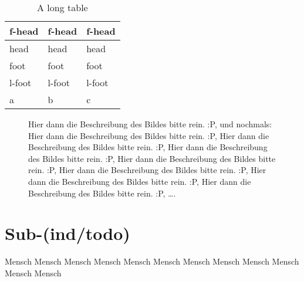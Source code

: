 \begin{longtable}{C{0.25\textwidth}Z{p}{0.2\textwidth}{\raggedleft}l}%
	\caption{A long table}\label{tab:introduction:1}\\%
	\toprule%
	f-head & f-head & f-head \\%
	\midrule%
	\endfirsthead%
	\toprule%
	head & head & head \\%
	\midrule%
	\endhead%
	\midrule%
	foot & foot & foot \\%
	\bottomrule%
	\endfoot%
	\midrule%
	l-foot & l-foot & l-foot \\%
	\bottomrule%
	\endlastfoot%
	a&b&c\\%
\end{longtable}%
\begin{figure}%
	\caption[Test 1]{Hier dann die Beschreibung des Bildes bitte rein. :P, und nochmals: Hier dann die Beschreibung des Bildes bitte rein. :P, Hier dann die Beschreibung des Bildes bitte rein. :P, Hier dann die Beschreibung des Bildes bitte rein. :P, Hier dann die Beschreibung des Bildes bitte rein. :P, Hier dann die Beschreibung des Bildes bitte rein. :P, Hier dann die Beschreibung des Bildes bitte rein. :P, Hier dann die Beschreibung des Bildes bitte rein. :P, \ldots{}.}%
	\label{fig:introduction:1}%
\end{figure}%
%

\section{Sub-(ind/todo)}%
\label{sec:introduction:Sub-indtodo}%
\lipsum[1-1] Mensch
%
\lipsum[1-3] Mensch\newline%
\lipsum[1-4] Mensch%
\lipsum[1-5] Mensch%
\lipsum[1-6] Mensch%
\lipsum[1-7] Mensch%
\lipsum[1-8] Mensch%
\lipsum[1-9] Mensch\newline%
\lipsum[1-10] Mensch\newline%
\lipsum[1-11] Mensch\newline%
\lipsum[1-12] Mensch\newline%
\lipsum[1-13] Mensch%
\lipsum[1-8]\lipsum[1-18] %

